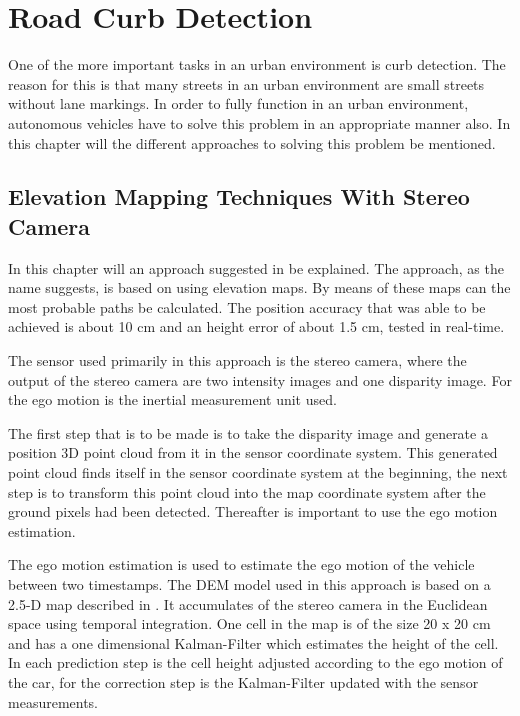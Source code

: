 \documentclass[conference]{IEEEtran}
\begin{document}
\section{Road Curb Detection}

One of the more important tasks in an urban environment is curb detection. The reason for this is that many streets in an urban environment are small streets without lane markings. In order to fully function in an urban environment, autonomous vehicles have to solve this problem in an appropriate manner also. In this chapter will the different approaches to solving this problem be mentioned.  

\subsection{Elevation Mapping Techniques With Stereo Camera}

In this chapter will an approach suggested in \cite{stereo} be explained. The approach, as the name suggests, is based on using elevation maps. By means of these maps can the most probable paths be calculated. The position accuracy that was able to be achieved is about 10 cm and an height error of about 1.5 cm, tested in real-time.

The sensor used primarily in this approach is the stereo camera, where the output of the stereo camera are two intensity images and one disparity image. For the ego motion is the inertial measurement unit used. 

The first step that is to be made is to take the disparity image and generate a position 3D point cloud from it in the sensor coordinate system. This generated point cloud finds itself in the sensor coordinate system at the beginning, the next step is to transform this point cloud into the map coordinate system after the ground pixels had been detected. Thereafter is important to use the ego motion estimation. 

The ego motion estimation is used to estimate the ego motion of the vehicle between two timestamps. The DEM model used in this approach is based on a 2.5-D map described in \cite{bewegung}. It accumulates of the stereo camera in the Euclidean space using temporal integration. One cell in the map is of the size 20 x 20 cm and has a one dimensional Kalman-Filter which estimates the height of the cell. In each prediction step is the cell height adjusted according to the ego motion of the car, for the correction step is the Kalman-Filter updated with the sensor measurements. 
\end{document}
